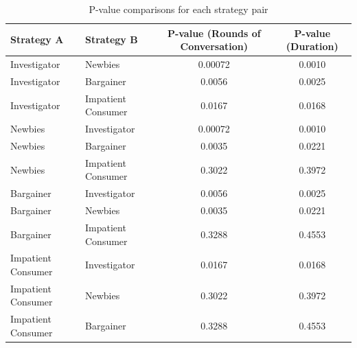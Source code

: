 \documentclass[ oneside,%
                    author={Cassie Qing Tang},
                    degree={BSc},
                     title={An Automated Response System for Disrupting Online Pet Scamming \\ },
                    subtitle={ }]{dissertation}
\begin{document}
\begin{table}[htbp]
\centering
\begin{tabular}{@{}llcc@{}}
\toprule
Strategy A & Strategy B & P-value (Rounds of Conversation) & P-value (Duration) \\ \midrule
Investigator & Newbies & 0.00072 & 0.0010 \\
Investigator & Bargainer & 0.0056 & 0.0025 \\
Investigator & Impatient Consumer & 0.0167 & 0.0168 \\
Newbies & Investigator & 0.00072 & 0.0010 \\
Newbies & Bargainer & 0.0035 & 0.0221 \\
Newbies & Impatient Consumer & 0.3022 & 0.3972 \\
Bargainer & Investigator & 0.0056 & 0.0025 \\
Bargainer & Newbies & 0.0035 & 0.0221 \\
Bargainer & Impatient Consumer & 0.3288 & 0.4553 \\
Impatient Consumer & Investigator & 0.0167 & 0.0168 \\
Impatient Consumer & Newbies & 0.3022 & 0.3972 \\
Impatient Consumer & Bargainer & 0.3288 & 0.4553 \\
\bottomrule
\end{tabular}
\caption{P-value comparisons for each strategy pair}
\label{tab:p_values}
\end{table}
\end{document}
